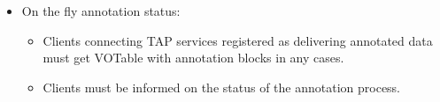 \begin {itemize}
  \item On the fly annotation status:
      \begin {itemize} 
          \item Clients connecting TAP services registered as delivering annotated data must get VOTable with annotation blocks in any cases. 
          \item Clients must be informed on the status of the annotation process.          
       \end {itemize}

\end {itemize}

